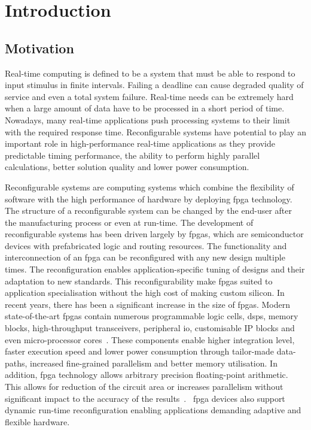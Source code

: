 
\chapter{Introduction}

\label{ch:introduction}

\section{Motivation}

Real-time computing is defined to be a system that must be able to respond to input stimulus in finite intervals.
Failing a deadline can cause degraded quality of service and even a total system failure.
Real-time needs can be extremely hard when a large amount of data have to be processed in a short period of time.
Nowadays, many real-time applications push processing systems to their limit with the required response time.
Reconfigurable systems have potential to play an important role in high-performance real-time applications as they provide predictable timing performance, the ability to perform highly parallel calculations, better solution quality and lower power consumption.

Reconfigurable systems are computing systems which combine the flexibility of software with the high performance of hardware by deploying \gls{fpga} technology.
The structure of a reconfigurable system can be changed by the end-user after the manufacturing process or even at run-time.
The development of reconfigurable systems has been driven largely by \glspl{fpga}, which are semiconductor devices with prefabricated logic and routing resources.
The functionality and interconnection of an \gls{fpga} can be reconfigured with any new design multiple times.
The reconfiguration enables application-specific tuning of designs and their adaptation to new standards.
This reconfigurability make \glspl{fpga} suited to application specialisation without the high cost of making custom silicon.
In recent years, there has been a significant increase in the size of \glspl{fpga}.
Modern state-of-the-art \glspl{fpga} contain numerous programmable logic cells, \glspl{dsp}, memory blocks, high-throughput transceivers, peripheral \gls{io}, customisable IP blocks and even micro-processor cores~\cite{alterasoc,xilinxzynq}.
These components enable higher integration level, faster execution speed and lower power consumption through tailor-made data-paths, increased fine-grained parallelism and better memory utilisation.
In addition, \gls{fpga} technology allows arbitrary precision floating-point arithmetic.
This allows for reduction of the circuit area or increases parallelism without significant impact to the accuracy of the results~\cite{chow11,chow12}.
~\gls{fpga} devices also support dynamic run-time reconfiguration enabling applications demanding adaptive and flexible hardware. 

